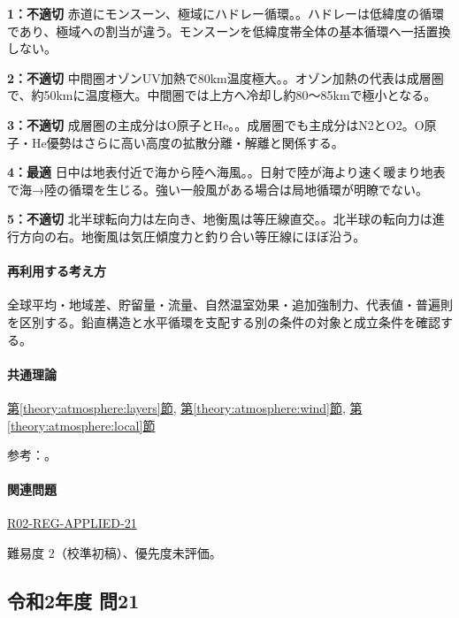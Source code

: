 \noindent\textbf{1：不適切} 赤道にモンスーン、極域にハドレー循環。。ハドレーは低緯度の循環であり、極域への割当が違う。モンスーンを低緯度帯全体の基本循環へ一括置換しない。\par

\noindent\textbf{2：不適切} 中間圏オゾンUV加熱で80km温度極大。。オゾン加熱の代表は成層圏で、約50kmに温度極大。中間圏では上方へ冷却し約80〜85kmで極小となる。\par

\noindent\textbf{3：不適切} 成層圏の主成分はO原子とHe。。成層圏でも主成分はN2とO2。O原子・He優勢はさらに高い高度の拡散分離・解離と関係する。\par

\noindent\textbf{4：最適} 日中は地表付近で海から陸へ海風。。日射で陸が海より速く暖まり地表で海→陸の循環を生じる。強い一般風がある場合は局地循環が明瞭でない。\par

\noindent\textbf{5：不適切} 北半球転向力は左向き、地衡風は等圧線直交。。北半球の転向力は進行方向の右。地衡風は気圧傾度力と釣り合い等圧線にほぼ沿う。\par

\paragraph{再利用する考え方} 全球平均・地域差、貯留量・流量、自然温室効果・追加強制力、代表値・普遍則を区別する。鉛直構造と水平循環を支配する別の条件の対象と成立条件を確認する。

\paragraph{共通理論} \hyperref[theory:atmosphere:layers]{第\ref*{theory:atmosphere:layers}節}, \hyperref[theory:atmosphere:wind]{第\ref*{theory:atmosphere:wind}節}, \hyperref[theory:atmosphere:local]{第\ref*{theory:atmosphere:local}節}

\par 参考：\cite{atm_noaa_layers,atm_noaa_winds,atm_jma_dynamic}。

\paragraph{関連問題} \hyperref[q:r02-reg-applied-21]{R02-REG-APPLIED-21}

\par 難易度 2（校準初稿）、優先度未評価。

\subsection{令和2年度 問21}
\label{q:r02-reg-applied-21}

